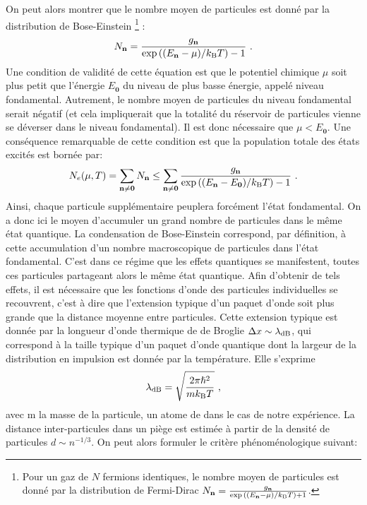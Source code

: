 On peut alors montrer que le nombre moyen de particules est donné par la distribution de Bose-Einstein \footnote{Pour un gaz de $N$ fermions identiques, le nombre moyen de particules est donné par la distribution de Fermi-Dirac $ N_{\mathbf{n}}=\frac{g_{\mathbf{n}}}{\exp{\left( (E_{\mathbf{n}}-\mu)/k_{\mathrm{B}}T\right)}+1}$.} \citep{diu1989elements}:
\begin{equation}
N_{\mathbf{n}}=\frac{g_{\mathbf{n}}}{\exp{\left( (E_{\mathbf{n}}-\mu)/k_{\mathrm{B}}T \right)}-1} \text{ .}
\end{equation}
Une condition de validité de cette équation est que le potentiel chimique $\mu$ soit plus petit que l'énergie $E_{\mathbf{0}}$ du niveau de plus basse énergie, appelé niveau fondamental. Autrement, le nombre moyen de particules du niveau fondamental serait négatif (et cela impliquerait que la totalité du réservoir de particules vienne se déverser dans le niveau fondamental). Il est donc nécessaire que $\mu < E_{\mathbf{0}}$. Une conséquence remarquable de cette condition est que la population totale des états excités est bornée par:
\begin{equation}
N_e(\mu,T)=\sum_{\mathbf{n}\neq\mathbf{0}} N_{\mathbf{n}} \leq \sum_{\mathbf{n} \neq \mathbf{0}} \frac{g_{\mathbf{n}}}{\exp{\left( (E_{\mathbf{n}}-E_{\mathbf{0}})/k_{\mathrm{B}}T \right)}-1} \text{ .}
\end{equation}
Ainsi, chaque particule supplémentaire peuplera forcément l'état fondamental. On a donc ici le moyen d'accumuler un grand nombre de particules dans le même état quantique. La condensation de Bose-Einstein correspond, par définition, à cette accumulation d'un nombre macroscopique de particules dans l'état fondamental. C'est dans ce régime que les effets quantiques se manifestent, toutes ces particules partageant alors le même état quantique. Afin d'obtenir de tels effets, il est nécessaire que les fonctions d'onde des particules individuelles se recouvrent, c'est à dire que l'extension typique d'un paquet d'onde soit plus grande que la distance moyenne entre particules. Cette extension typique est donnée par la longueur d'onde thermique de de Broglie $\Delta x \sim \lambda_{\mathrm{dB}}$, qui correspond à la taille typique d'un paquet d'onde quantique dont la largeur de la distribution en impulsion est donnée par la température. Elle s'exprime \citep{diu1989elements}
\begin{equation}
\lambda_{\mathrm{dB}}=\sqrt{\frac{2\pi \hslash^2}{m k_{\mathrm{B}} T}} \text{ ,}
\end{equation}
avec m la masse de la particule, un atome de  dans le cas de notre expérience. La distance inter-particules dans un piège est estimée à partir de la densité de particules $d \sim n^{-1/3}$. On peut alors formuler le critère phénoménologique suivant:
